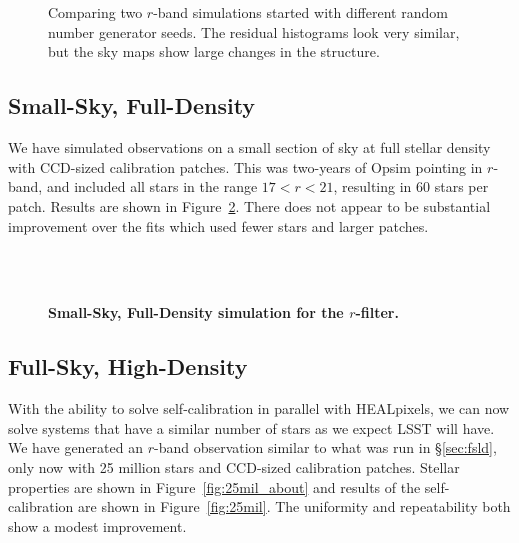 \documentclass[12pt,preprint]{aastex}
\begin{document}
\begin{figure}
 \\
 \\
\caption{Comparing two $r$-band simulations started with different random number generator seeds.  The residual histograms look very similar, but the sky maps show large changes in the structure. \label{fig:diffseed} }
\end{figure}


\subsection{Small-Sky, Full-Density}
We have simulated observations on a small section of sky at full stellar density with CCD-sized calibration patches.  This was two-years of Opsim pointing in $r$-band, and included all stars in the range $17 < r < 21 $, resulting in 60 stars per patch.  Results are shown in Figure~\ref{fig:r1e6hd}.  There does not appear to be substantial improvement over the fits which used fewer stars and larger patches.

\begin{figure}
 \\
 \\
\caption{ {\bf Small-Sky, Full-Density simulation for the $r$-filter.}  \label{fig:r1e6hd}}
\end{figure}

\subsection{Full-Sky, High-Density}

With the ability to solve self-calibration in parallel with HEALpixels, we can now solve systems that have a similar number of stars as we expect LSST will have.  We have generated an $r$-band observation similar to what was run in \S\ref{sec:fsld}, only now with 25 million stars and CCD-sized calibration patches.  Stellar properties are shown in Figure~\ref{fig:25mil_about} and results of the self-calibration are shown in Figure~\ref{fig:25mil}.  The uniformity and repeatability both show a modest improvement.  
\end{document}
